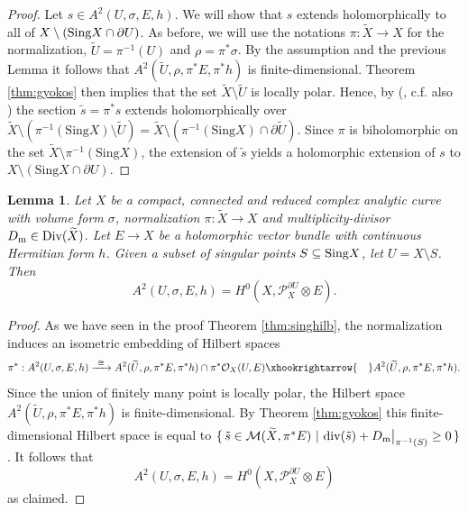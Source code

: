 \documentclass[11pt]{amsart}
\newtheorem{lemma}[theorem]{Lemma}
\theoremstyle{definition}
\newcommand{\ra}{\rightarrow}
\begin{document}
\begin{proof}
    Let $s \in A^2(U,\sigma,E,h)$. We will show that $s$ extends holomorphically to all of $X \setminus(\text{\normalfont Sing}X\cap \partial U)$. As before, we will use the notations $\pi : \widetilde{X} \to X$ for the normalization, $\widetilde{U} = \pi^{-1}(U)$ and $\rho = \pi^*\sigma$. By the assumption and the previous Lemma it follows that $A^2(\widetilde{U},\rho,\pi^*E, \pi^*h)$ is finite-dimensional. Theorem \ref{thm:gyokos} then implies that the set $\widetilde{X}\setminus \widetilde{U}$ is locally polar. Hence, by (\cite[Proposition 2.1]{Sz22}, c.f. also \cite{S82}) the section $\tilde{s} = \pi^*s$ extends holomorphically over $\tilde{X} \setminus (\pi^{-1}(\text{Sing}X)\setminus\widetilde{U})  = \widetilde{X} \setminus (\pi^{-1}(\text{Sing}X)\cap \partial \widetilde{U})$. Since $\pi$ is biholomorphic on the set $\widetilde{X}\setminus \pi^{-1}(\text{Sing}X)$, the extension of $\tilde{s}$ yields a holomorphic extension of $s$ to $X \setminus (\text{Sing}X\cap \partial U)$.
\end{proof}

\begin{lemma}\label{lem:main}
    Let $X$ be a compact, connected and reduced complex analytic curve with volume form $\sigma$, normalization $\pi: \widetilde{X} \to X$ and multiplicity-divisor $D_\text{\normalfont m} \in \text{\normalfont Div}(\widetilde{X})$. Let $E\ra X$ be a holomorphic vector bundle with continuous Hermitian form $h$. Given a subset of singular points $S \subseteq \text{\normalfont Sing}X$, let $U = X \setminus S$. Then
    $$A^2(U,\sigma,E,h) = H^0(X,\mathcal{P}_X^{\partial U} \otimes E ).$$
\end{lemma}


\begin{proof}
    As we have seen in the proof Theorem \ref{thm:singhilb}, the normalization induces an isometric embedding of Hilbert spaces
    $$\pi^* : A^2(U,\sigma,E,h) \xrightarrow{ \ \cong \ } A^2(\widetilde{U},\rho,\pi^*E,\pi^*h) \cap \pi^*\mathcal{O}_X(U,E) \xhookrightarrow{ \ \ \ } A^2(\widetilde{U},\rho,\pi^*E,\pi^*h).$$
    Since the union of finitely many point is locally polar, the Hilbert space $A^2(\widetilde{U},\rho,\pi^*E,\pi^*h)$ is finite-dimensional. By Theorem \ref{thm:gyokos} this finite-dimensional Hilbert space is equal to $\{ \, \tilde{s} \in \mathcal{M} (\widetilde{X},\pi^*E) \ | \ {\rm div}(\tilde{s}) + D_{\rm m}\big|_{\pi^{-1}(S)} \geq 0 \, \}$. It follows that $$A^2(U,\sigma,E,h) = H^0(X,\mathcal{P}_X^{\partial U} \otimes E )$$
    as claimed.
    \end{proof}
    
\end{document}
